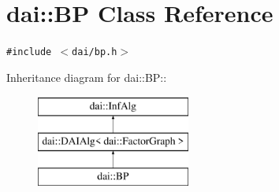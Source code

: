 \hypertarget{classdai_1_1BP}{
\section{dai::BP Class Reference}
\label{classdai_1_1BP}
}
{\tt \#include $<$dai/bp.h$>$}

Inheritance diagram for dai::BP::\begin{figure}[H]
\begin{center}
\leavevmode
\includegraphics[height=3cm]{classdai_1_1BP}
\end{center}
\end{figure}


